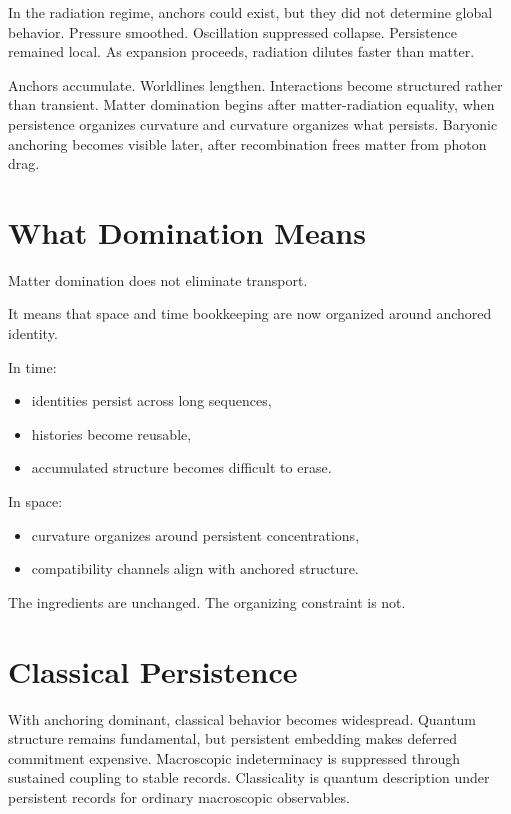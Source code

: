 \documentclass[11pt,twoside,openright]{book}
\begin{document}
In the radiation regime, anchors could exist, but they did not determine global behavior. Pressure smoothed. Oscillation suppressed collapse. Persistence remained local. As expansion proceeds, radiation dilutes faster than matter.

Anchors accumulate. Worldlines lengthen. Interactions become structured rather than transient. Matter domination begins after matter-radiation equality, when persistence organizes curvature and curvature organizes what persists. Baryonic anchoring becomes visible later, after recombination frees matter from photon drag.

\section*{What Domination Means}

Matter domination does not eliminate transport.

It means that space and time bookkeeping are now organized around anchored identity.

In time:

\begin{itemize}
\item identities persist across long sequences,
\item histories become reusable,
\item accumulated structure becomes difficult to erase.
\end{itemize}

In space:

\begin{itemize}
\item curvature organizes around persistent concentrations,
\item compatibility channels align with anchored structure.
\end{itemize}

The ingredients are unchanged. The organizing constraint is not.

\section*{Classical Persistence}

With anchoring dominant, classical behavior becomes widespread. Quantum structure remains fundamental, but persistent embedding makes deferred commitment expensive. Macroscopic indeterminacy is suppressed through sustained coupling to stable records. Classicality is quantum description under persistent records for ordinary macroscopic observables.
\end{document}
